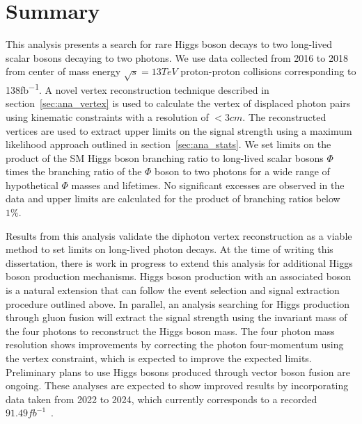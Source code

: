 \section{Summary} \label{sec:ana_conclusion}
This analysis presents a search for rare Higgs boson decays to two long-lived scalar bosons decaying to two photons. We use data collected from 2016 to 2018 from center of mass energy $\sqrt{s}=13\unit{TeV}$ proton-proton collisions corresponding to 138\unit{fb^{-1}}. A novel vertex reconstruction technique described in section~\ref{sec:ana_vertex} is used to calculate the vertex of displaced photon pairs using kinematic constraints with a resolution of $<3\unit{cm}$. The reconstructed vertices are used to extract upper limits on the signal strength using a maximum likelihood approach outlined in section~\ref{sec:ana_stats}. We set limits on the product of the SM Higgs boson branching ratio to long-lived scalar bosons $\Phi$ times the branching ratio of the $\Phi$ boson to two photons for a wide range of hypothetical $\Phi$ masses and lifetimes. No significant excesses are observed in the data and upper limits are calculated for the product of branching ratios below $1\%$.

Results from this analysis validate the diphoton vertex reconstruction as a viable method to set limits on long-lived photon decays. At the time of writing this dissertation, there is work in progress to extend this analysis for additional Higgs boson production mechanisms. Higgs boson production with an associated \PW boson is a natural extension that can follow the event selection and signal extraction procedure outlined above. In parallel, an analysis searching for Higgs production through gluon fusion will extract the signal strength using the invariant mass of the four photons to reconstruct the Higgs boson mass. The four photon mass resolution shows improvements by correcting the photon four-momentum using the vertex constraint, which is expected to improve the expected limits. Preliminary plans to use Higgs bosons produced through vector boson fusion are ongoing. These analyses are expected to show improved results by incorporating data taken from 2022 to 2024, which currently corresponds to a recorded $91.49\unit{fb^{-1}}$~\cite{CMSlumi}.